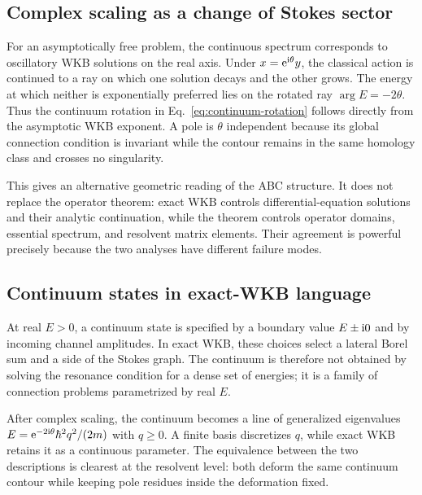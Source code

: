 \subsection{Complex scaling as a change of Stokes sector}
\label{subsec:abc-wkb}

For an asymptotically free problem, the continuous spectrum corresponds to
oscillatory WKB solutions on the real axis.  Under $x=\mathrm{e}^{\mathrm{i}\theta}y$, the
classical action is continued to a ray on which one solution decays and the
other grows.  The energy at which neither is exponentially preferred lies on
the rotated ray $\arg E=-2\theta$.  Thus the continuum rotation in
Eq.~\eqref{eq:continuum-rotation} follows directly from the asymptotic WKB
exponent.  A pole is $\theta$ independent because its global connection
condition is invariant while the contour remains in the same homology class
and crosses no singularity.

This gives an alternative geometric reading of the ABC structure.  It does
not replace the operator theorem: exact WKB controls differential-equation
solutions and their analytic continuation, while the theorem controls
operator domains, essential spectrum, and resolvent matrix elements.  Their
agreement is powerful precisely because the two analyses have different
failure modes.

\subsection{Continuum states in exact-WKB language}
\label{subsec:wkb-continuum}

At real $E>0$, a continuum state is specified by a boundary value
$E\pm\mathrm{i}0$ and by incoming channel amplitudes.  In exact WKB, these choices
select a lateral Borel sum and a side of the Stokes graph.  The continuum is
therefore not obtained by solving the resonance condition for a dense set of
energies; it is a family of connection problems parametrized by real $E$.

After complex scaling, the continuum becomes a line of generalized
eigenvalues $E=\mathrm{e}^{-2\mathrm{i}\theta}\hbar^2q^2/(2m)$ with $q\ge0$.  A finite
basis discretizes $q$, while exact WKB retains it as a continuous parameter.
The equivalence between the two descriptions is clearest at the resolvent
level: both deform the same continuum contour while keeping pole residues
inside the deformation fixed.

